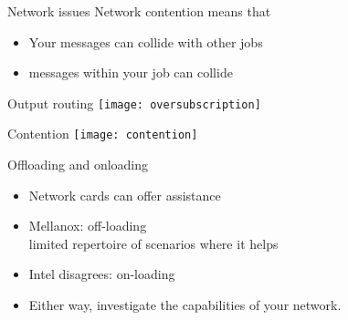 \begin{numberedframe}{Network issues}
  Network contention means that
  \begin{itemize}
  \item Your messages can collide with other jobs
  \item messages within your job can collide
  \end{itemize}
\end{numberedframe}

\begin{numberedframe}{Output routing}
  \texttt{[image: oversubscription]}
\end{numberedframe}

\begin{numberedframe}{Contention}
  \texttt{[image: contention]}
\end{numberedframe}

\begin{numberedframe}{Offloading and onloading}

  \begin{itemize}
  \item Network cards can offer assistance
  \item Mellanox: off-loading\\
    limited repertoire of scenarios where it helps
  \item Intel disagrees: on-loading
  \item Either way, investigate the capabilities of your network.
  \end{itemize}
\end{numberedframe}

